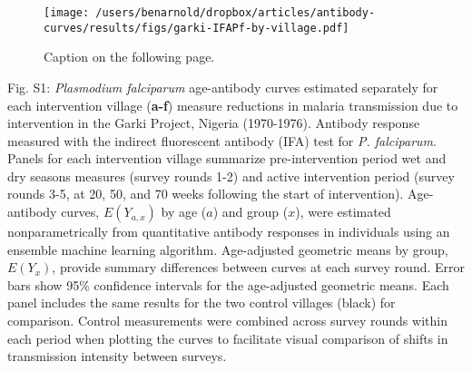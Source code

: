 \documentclass[11pt]{article}
\begin{document}
\renewcommand{\figurename}{Fig.}
\setcounter{figure}{0} 
\renewcommand{\thefigure}{S\arabic{figure}}



\clearpage
\begin{figure}[htbp]
\begin{center}
\texttt{[image: /users/benarnold/dropbox/articles/antibody-curves/results/figs/garki-IFAPf-by-village.pdf]}
\begin{minipage}{\textwidth}
\caption{Caption on the following page.}
\label{fig:garkiVillageEy}
\end{minipage}
\end{center}
\end{figure}
\clearpage
Fig. S1: \textit{Plasmodium falciparum} age-antibody curves estimated separately for each intervention village (\textbf{a-f}) measure reductions in malaria transmission due to intervention in the Garki Project, Nigeria (1970-1976).  Antibody response measured with the indirect fluorescent antibody (IFA) test for \textit{P. falciparum}. Panels for each intervention village summarize pre-intervention period wet and dry seasons measures (survey rounds 1-2) and active intervention period (survey rounds 3-5, at 20, 50, and 70 weeks following the start of intervention).  Age-antibody curves, $E(Y_{a,x})$ by age ($a$) and group ($x$), were estimated nonparametrically from quantitative antibody responses in individuals using an ensemble machine learning algorithm. Age-adjusted geometric means by group, $E(Y_x)$, provide summary differences between curves at each survey round. Error bars show 95\% confidence intervals for the age-adjusted geometric means. Each panel includes the same results for the two control villages (black) for comparison.  Control measurements were combined across survey rounds within each period when plotting the curves to facilitate visual comparison of shifts in transmission intensity between surveys. 
\end{document}
